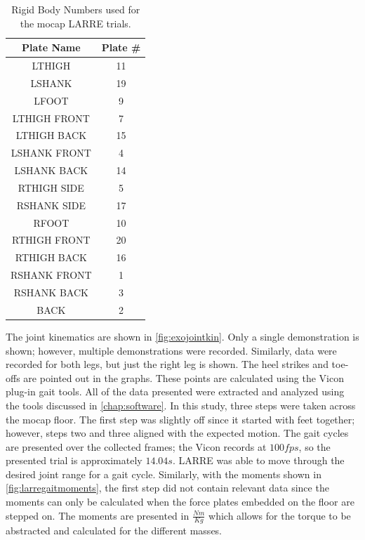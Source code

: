 \begin{table}[h!]
    \begin{centering}
            \begin{tabular}{||c  c ||} 
         \hline
            Plate Name & Plate \#  \\ [0.5ex] 
            \hline\hline
            LTHIGH	& 11 \\
            LSHANK &	19\\
            LFOOT &	9 \\
            LTHIGH FRONT &	7\\
            LTHIGH BACK &	15\\
            LSHANK FRONT &	4\\
            LSHANK BACK &	14\\
            RTHIGH SIDE &	5\\
            RSHANK SIDE &	17\\
            RFOOT &	10\\
            RTHIGH FRONT &	20\\
            RTHIGH BACK &	16\\
            RSHANK FRONT &	1\\
            RSHANK BACK &	3\\
            BACK &	2\\ [1ex] 
         \hline
        \end{tabular}
        \caption[Exoskeleton Rigid Body Numbers]{Rigid Body Numbers used for the mocap LARRE trials.}
        \label{tab:exomarkerlayout}
    \end{centering}
\end{table}

The joint kinematics are shown in \autoref{fig:exojointkin}. Only a single demonstration is shown; however, multiple demonstrations were recorded. Similarly, data were recorded for both legs, but just the right leg is shown. The heel strikes and toe-offs are pointed out in the graphs. These points are calculated using the Vicon plug-in gait tools. All of the data presented were extracted and analyzed using the tools discussed in \autoref{chap:software}. In this study, three steps were taken across the mocap floor. The first step was slightly off since it started with feet together; however, steps two and three aligned with the expected motion. The gait cycles are presented over the collected frames; the Vicon records at $100fps$, so the presented trial is approximately $14.04s$. LARRE was able to move through the desired joint range for a gait cycle. Similarly, with the moments shown in \autoref{fig:larregaitmoments}, the first step did not contain relevant data since the moments can only be calculated when the force plates embedded on the floor are stepped on. The moments are presented in $\frac{Nm}{Kg}$ which allows for the torque to be abstracted and calculated for the different masses. 



